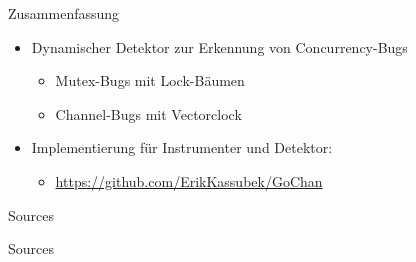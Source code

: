 \documentclass[aspectratio=169]{beamer}  %
\begin{document}
\begin{frame}{Zusammenfassung}
  \begin{itemize}
    \item Dynamischer Detektor zur Erkennung von Concurrency-Bugs
    \begin{itemize}
      \item Mutex-Bugs mit Lock-Bäumen
      \item Channel-Bugs mit Vectorclock
    \end{itemize}
    \item Implementierung für Instrumenter und Detektor:
    \begin{itemize}
      \item \url{https://github.com/ErikKassubek/GoChan}
    \end{itemize}
  \end{itemize}
\end{frame}






\begin{frame}{Sources}
    \nocite{*}
    \AtNextBibliography{\tiny}
    \printbibliography[heading=none, keyword={1}]
\end{frame}

\begin{frame}{Sources}
  \nocite{*}
  \AtNextBibliography{\tiny}
  \printbibliography[heading=none, keyword={2}]
\end{frame}
\end{document}
